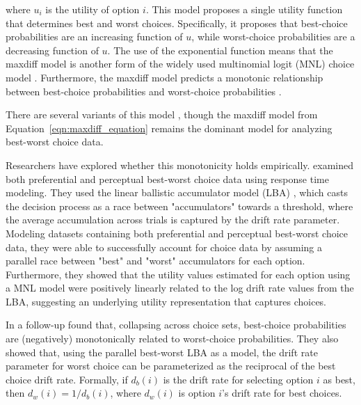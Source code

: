 where $u_{i}$ is the utility of option $i$. This model proposes a single utility function that determines best and worst choices. Specifically, it proposes that best-choice probabilities are an increasing function of $u$, while worst-choice probabilities are a decreasing function of $u$. The use of the exponential function means that the maxdiff model is another form of the widely used multinomial logit (MNL) choice model \parencite{hausman1984specification}. Furthermore, the maxdiff model predicts a monotonic relationship between best-choice probabilities and worst-choice probabilities \parencite{hawkinsBestTimesWorst2014}.

There are several variants of this model \parencite{marleyProbabilisticModelsBest2005,marleyProbabilisticModelsSetdependent2008,marleyModelsBestWorst2012,flynnBestWorstScaling2007,flynn2014best}, though the maxdiff model from Equation~\ref{eqn:maxdiff_equation} remains the dominant model for analyzing best-worst choice data.

Researchers have explored whether this monotonicity holds empirically. \textcite{hawkinsIntegratingCognitiveProcess2014a} examined both preferential and perceptual best-worst choice data using response time modeling. They used the linear ballistic accumulator model (LBA) \textcite{brownSimplestCompleteModel2008b}, which casts the decision process as a race between "accumulators" towards a threshold, where the average accumulation across trials is captured by the drift rate parameter. Modeling datasets containing both preferential and perceptual best-worst choice data, they were able to successfully account for choice data by assuming a parallel race between "best" and "worst" accumulators for each option. Furthermore, they showed that the utility values estimated for each option using a MNL model were positively linearly related to the log drift rate values from the LBA, suggesting an underlying utility representation that captures choices. 

In a follow-up \textcite{hawkinsBestTimesWorst2014} found that, collapsing across choice sets, best-choice probabilities are (negatively) monotonically related to worst-choice probabilities. They also showed that, using the parallel best-worst LBA as a model, the drift rate parameter for worst choice can be parameterized as the reciprocal of the best choice drift rate. Formally, if $d_{b}(i)$ is the drift rate for selecting option $i$ as best, then $d_{w}(i)=1/d_{b}(i)$, where $d_{w}(i)$ is option $i$'s drift rate for best choices. 

